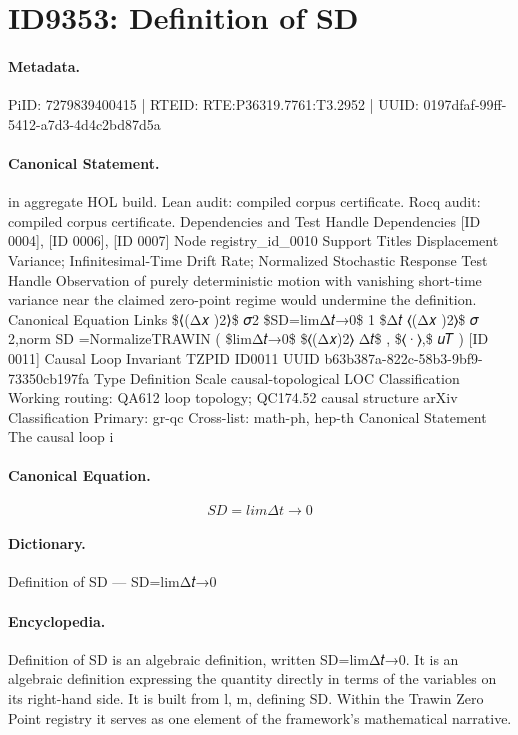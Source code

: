 \section*{ID9353: Definition of SD}
\paragraph{Metadata.}
PiID: 7279839400415 | RTEID: RTE:P36319.7761:T3.2952 | UUID: 0197dfaf-99ff-5412-a7d3-4d4c2bd87d5a

\paragraph{Canonical Statement.}
in aggregate HOL build. Lean audit: compiled corpus certificate. Rocq audit: compiled corpus certificate. Dependencies and Test Handle Dependencies [ID 0004], [ID 0006], [ID 0007] Node registry\_id\_0010 Support Titles Displacement Variance; Infinitesimal-Time Drift Rate; Normalized Stochastic Response Test Handle Observation of purely deterministic motion with vanishing short-time variance near the claimed zero-point regime would undermine the definition. Canonical Equation Links \$⟨(Δ𝑥 )2⟩\$ 𝜎2 \$SD=limΔ𝑡→0\$ 1 \$Δ𝑡 ⟨(Δ𝑥 )2⟩\$ 𝜎 2,norm SD =NormalizeTRAWIN ( \$limΔ𝑡→0\$ \$⟨(Δ𝑥)2⟩ Δ𝑡\$ , \$⟨·⟩,\$ 𝑢𝑇 ) [ID 0011] Causal Loop Invariant TZPID ID0011 UUID b63b387a-822c-58b3-9bf9-73350cb197fa Type Definition Scale causal-topological LOC Classification Working routing: QA612 loop topology; QC174.52 causal structure arXiv Classification Primary: gr-qc Cross-list: math-ph, hep-th Canonical Statement The causal loop i

\paragraph{Canonical Equation.}
\[
SD=limΔ𝑡→0
\]

\paragraph{Dictionary.}
Definition of SD — SD=limΔ𝑡→0

\paragraph{Encyclopedia.}
Definition of SD is an algebraic definition, written SD=limΔ𝑡→0. It is an algebraic definition expressing the quantity directly in terms of the variables on its right-hand side. It is built from l, m, defining SD. Within the Trawin Zero Point registry it serves as one element of the framework's mathematical narrative.
